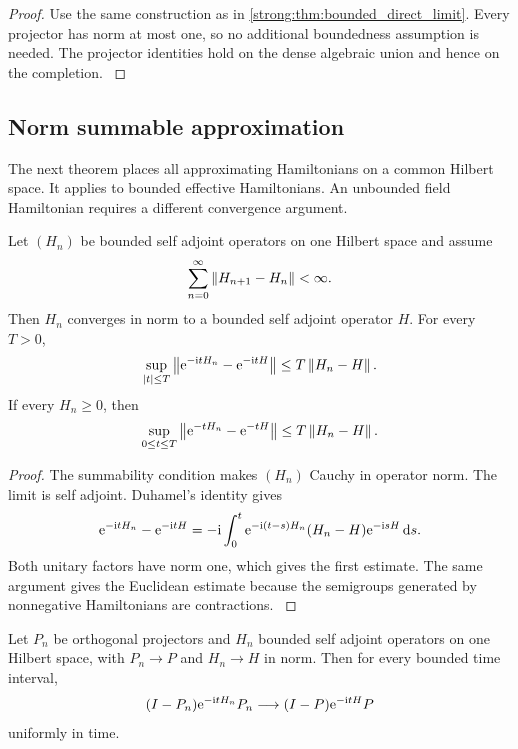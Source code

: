 \begin{proof}\label{strong:proof:074}
Use the same construction as in \cref{strong:thm:bounded_direct_limit}. Every projector has norm at most one, so no additional boundedness assumption is needed. The projector identities hold on the dense algebraic union and hence on the completion.
\label{strong:proof:074:end}\end{proof}

\subsection{Norm summable approximation}\label{strong:subsec:norm_summable}

The next theorem places all approximating Hamiltonians on a common Hilbert space. It applies to bounded effective Hamiltonians. An unbounded field Hamiltonian requires a different convergence argument.

\begin{theorem}\label{strong:theorem:047}\label{strong:thm:norm_summable_tower}
Let \((H_n)\) be bounded self adjoint operators on one Hilbert space and assume
\[
\sum_{n=0}^{\infty}\left\lVert H_{n+1}-H_n\right\rVert<\infty.
\]
Then \(H_n\) converges in norm to a bounded self adjoint operator \(H\). For every \(T>0\),
\[
\sup_{\abs t\leq T}
\norm{\e^{-\ii tH_n}-\e^{-\ii tH}}
\leq
T\norm{H_n-H}.
\]
If every \(H_n\geq0\), then
\[
\sup_{0\leq t\leq T}
\norm{\e^{-tH_n}-\e^{-tH}}
\leq
T\norm{H_n-H}.
\]
\end{theorem}

\begin{proof}\label{strong:proof:075}
The summability condition makes \((H_n)\) Cauchy in operator norm. The limit is self adjoint. Duhamel's identity gives
\[
\e^{-\ii tH_n}-\e^{-\ii tH}
=-\ii\int_0^t
\e^{-\ii(t-s)H_n}(H_n-H)\e^{-\ii sH}\dd s.
\]
Both unitary factors have norm one, which gives the first estimate. The same argument gives the Euclidean estimate because the semigroups generated by nonnegative Hamiltonians are contractions.
\label{strong:proof:075:end}\end{proof}

\begin{corollary}\label{strong:corollary:016}\label{strong:cor:limit_leakage}
Let \(P_n\) be orthogonal projectors and \(H_n\) bounded self adjoint operators on one Hilbert space, with \(P_n\to P\) and \(H_n\to H\) in norm. Then for every bounded time interval,
\[
(I-P_n)\e^{-\ii tH_n}P_n
\longrightarrow
(I-P)\e^{-\ii tH}P
\]
uniformly in time.
\end{corollary}

